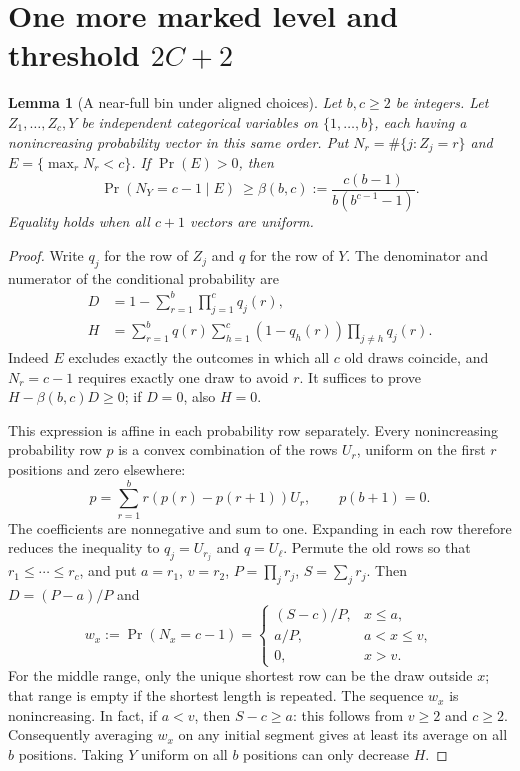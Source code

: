 \documentclass[11pt]{article}
\newtheorem{lemma}{Lemma}
\begin{document}
\section{One more marked level and threshold $2C+2$}
\begin{lemma}[A near-full bin under aligned choices]\label{lem:nearfull}
Let $b,c\geq2$ be integers. Let $Z_1,\ldots,Z_c,Y$ be independent
categorical variables on $\{1,\ldots,b\}$, each having a nonincreasing
probability vector in this same order. Put
$N_r=\#\{j:Z_j=r\}$ and $E=\{\max_r N_r<c\}$.
If $\Pr(E)>0$, then
\[
 \Pr(N_Y=c-1\mid E)\ \geq
 \beta(b,c):=\frac{c(b-1)}{b(b^{c-1}-1)}.
\]
Equality holds when all $c+1$ vectors are uniform.
\end{lemma}
\begin{proof}
Write $q_j$ for the row of $Z_j$ and $q$ for the row of $Y$.
The denominator and numerator of the conditional probability are
\begin{align*}
 D&=1-\sum_{r=1}^b\prod_{j=1}^c q_j(r),\\
 H&=\sum_{r=1}^b q(r)\sum_{h=1}^c
             (1-q_h(r))\prod_{j\ne h}q_j(r).
\end{align*}
Indeed $E$ excludes exactly the outcomes in which all $c$ old draws
coincide, and $N_r=c-1$ requires exactly one draw to avoid $r$.
It suffices to prove $H-\beta(b,c)D\geq0$; if $D=0$, also $H=0$.

This expression is affine in each probability row separately. Every
nonincreasing probability row $p$ is a convex combination of the rows
$U_r$, uniform on the first $r$ positions and zero elsewhere:
\[
 p=\sum_{r=1}^b r(p(r)-p(r+1))U_r,\qquad p(b+1)=0.
\]
The coefficients are nonnegative and sum to one. Expanding in each
row therefore reduces the inequality to $q_j=U_{r_j}$ and $q=U_\ell$.
Permute the old rows so that $r_1\leq\cdots\leq r_c$, and put
$a=r_1$, $v=r_2$, $P=\prod_jr_j$, $S=\sum_jr_j$.
Then $D=(P-a)/P$ and
\[
 w_x:=\Pr(N_x=c-1)=
 \begin{cases}
 (S-c)/P,&x\leq a,\\
 a/P,&a<x\leq v,\\
 0,&x>v.
 \end{cases}
\]
For the middle range, only the unique shortest row can be the draw
outside $x$; that range is empty if the shortest length is repeated.
The sequence $w_x$ is nonincreasing. In fact, if $a<v$, then
$S-c\geq a$: this follows from $v\geq2$ and $c\geq2$.
Consequently averaging $w_x$ on any initial segment gives at least
its average on all $b$ positions. Taking $Y$ uniform on all $b$
positions can only decrease $H$.


\end{proof}
\end{document}
